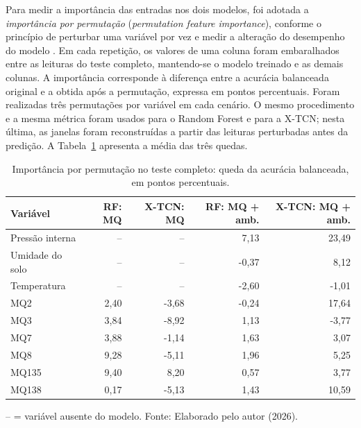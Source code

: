 Para medir a importância das entradas nos dois modelos, foi adotada a
\emph{importância por permutação} (\emph{permutation feature importance}),
conforme o princípio de perturbar uma variável por vez e medir a alteração do
desempenho do modelo \cite{fisher2019modelreliance}. Em cada repetição, os
valores de uma coluna foram embaralhados entre as leituras do teste completo,
mantendo-se o modelo treinado e as demais colunas. A importância corresponde à
diferença entre a acurácia balanceada original e a obtida após a permutação,
expressa em pontos percentuais. Foram realizadas três permutações por variável
em cada cenário. O mesmo procedimento e a mesma métrica foram usados para o
Random Forest e para a X-TCN; nesta última, as janelas foram reconstruídas a
partir das leituras perturbadas antes da predição. A
Tabela~\ref{tab:importancia_variaveis_vacuo} apresenta a média das três quedas.

\begin{table}[htbp]
    \centering
    \caption{Importância por permutação no teste completo: queda da acurácia balanceada, em pontos percentuais.}
    \label{tab:importancia_variaveis_vacuo}
    \scriptsize
    \begin{tabular}{lrrrr}
        \hline
        \textbf{Variável} &
        \textbf{RF: MQ} &
        \textbf{X-TCN: MQ} &
        \textbf{RF: MQ + amb.} &
        \textbf{X-TCN: MQ + amb.} \\
        \hline
        Pressão interna & --    & --    & 7,13  & 23,49 \\
        Umidade do solo & --    & --    & -0,37 & 8,12  \\
        Temperatura     & --    & --    & -2,60 & -1,01 \\
        MQ2             & 2,40  & -3,68 & -0,24 & 17,64 \\
        MQ3             & 3,84  & -8,92 & 1,13  & -3,77 \\
        MQ7             & 3,88  & -1,14 & 1,63  & 3,07  \\
        MQ8             & 9,28  & -5,11 & 1,96  & 5,25  \\
        MQ135           & 9,40  & 8,20  & 0,57  & 3,77  \\
        MQ138           & 0,17  & -5,13 & 1,43  & 10,59 \\
        \hline
    \end{tabular}

    \vspace{0.1cm}
    {\footnotesize -- = variável ausente do modelo. Fonte: Elaborado pelo autor (2026).}
\end{table}

